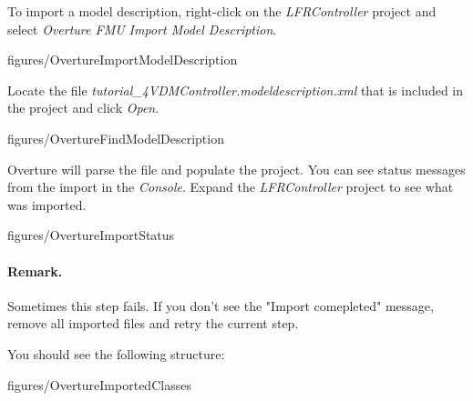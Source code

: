 \documentclass[11pt,a4paper]{../tutorial}
\begin{document}
\begin{instructions}

\item To import a model description, right-click on the \emph{LFRController} project and select \emph{Overture FMU \menusep Import Model Description}.

    \begin{annotation}[width=0.99\linewidth,trim=0 25 0 0,clip]{figures/OvertureImportModelDescription}
    \end{annotation}

\item Locate the file \emph{tutorial\_4\pathsep{}VDM\pathsep{}Controller.modeldescription.xml} that is included in the project and click \emph{Open}.


    \begin{annotation}[width=0.8\linewidth]{figures/OvertureFindModelDescription}
    \end{annotation}

\item Overture will parse the file and populate the project. You can see status messages from the import in the \emph{Console}. Expand the \emph{LFRController} project to see what was imported.

    \begin{annotation}[width=0.99\linewidth]{figures/OvertureImportStatus}
    \end{annotation}
		
    \paragraph{Remark.} Sometimes this step fails. If you don't see the "Import comepleted" message, remove all imported files and retry the current step.

    You should see the following structure:

    \begin{annotation}[width=0.25\linewidth,trim=0 300 535 0,clip]{figures/OvertureImportedClasses}
    \end{annotation}
	
\end{instructions}
\end{document}
